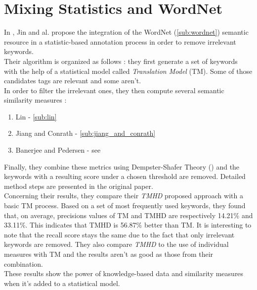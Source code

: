\section{Mixing Statistics and WordNet} %
\label{sec:mixing_statistics_and_wordnet}
In \cite{jin2005image}, Jin and al. propose the integration of the WordNet (\ref{sub:wordnet}) semantic resource in a statistic-based annotation process in order to remove irrelevant keywords.\\
Their algorithm is organized as follows : they first generate a set of keywords with the help of a statistical model called \emph{Translation Model} (TM). Some of those candidates tags are relevant and some aren't.\\
In order to filter the irrelevant ones, they then compute several semantic similarity measures : 
\begin{enumerate}
	\item Lin - \ref{sub:lin}
	\item Jiang and Conrath - \ref{sub:jiang_and_conrath}
	\item Banerjee and Pedersen - see \cite{banerjee2003extended}
\end{enumerate}
Finally, they combine these metrics using Dempster-Shafer Theory (\cite{shafer1976mathematical}) and the keywords with a resulting score under a chosen threshold are removed. Detailed method steps are presented in the original paper. \\
Concerning their results, they compare their \emph{TMHD} proposed approach with a basic TM process. Based on a set of most frequently used keywords, they found that, on average, precisions values of TM and TMHD are respectively 14.21\% and 33.11\%. This indicates that TMHD is 56.87\% better than TM. It is interesting to note that the recall score stays the same due to the fact that only irrelevant keywords are removed. They also compare \emph{TMHD} to the use of individual measures with TM and the results aren't as good as those from their combination.\\
These results show the power of knowledge-based data and similarity measures when it's added to a statistical model.

